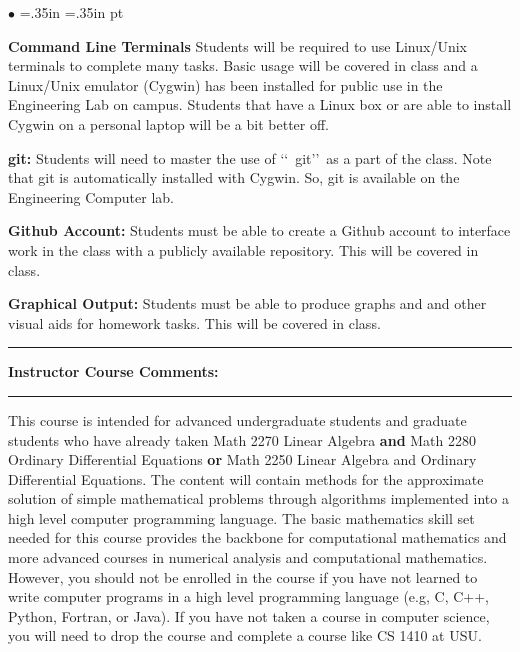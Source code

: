 \documentclass[10pt,fleqn]{article}
\begin{document}
\noindent
\begin{list}{$\bullet$}{ \parsep=0pt \listparindent=0pt
\topsep=0pt \rightmargin=.35in \leftmargin=.35in   pt \itemsep=2pt}
  \item {\bf Command Line Terminals} Students will be required to use
        Linux/Unix terminals to complete many tasks. Basic usage will be
        covered in class and a Linux/Unix emulator (Cygwin) has been installed
        for public use in the Engineering Lab on campus. Students that have a
        Linux box or are able to install Cygwin on a personal laptop will be a
        bit better off.
  \item {\bf git:} Students will need to master the use of \lq\lq\ git\rq\rq\
        as a part of the class. Note that git is automatically installed with
        Cygwin. So, git is available on the Engineering Computer lab. 
  \item {\bf Github Account:} Students must be able to create a Github account
        to interface work in the class with a publicly available repository.
        This will be covered in class.
  \item {\bf Graphical Output:} Students must be able to produce graphs and
        and other visual aids for homework tasks. This will be covered in class.
\end{list}

\medskip
\vskip0.1in\hrule\vskip0.1in \noindent
{\bf Instructor Course Comments:}
\vskip0.1in\hrule\vskip0.1in
\noindent
This course is intended for advanced undergraduate students and graduate
students who have already taken Math 2270 Linear Algebra {\bf and} Math 2280
Ordinary Differential Equations {\bf or} Math 2250 Linear Algebra and Ordinary
Differential Equations. The content will contain methods for the approximate
solution of simple mathematical problems through algorithms implemented into a
high level computer programming language. The basic mathematics skill set needed
for this course provides the backbone for computational mathematics and more
advanced courses in numerical analysis and computational mathematics. However,
you should not be enrolled in the course if you have not learned to write
computer programs in a high level programming language (e.g, C, C++, Python,
Fortran, or Java). If you have not taken a course in computer science, you will
need to drop the course and complete a course like CS 1410 at USU.
\end{document}
